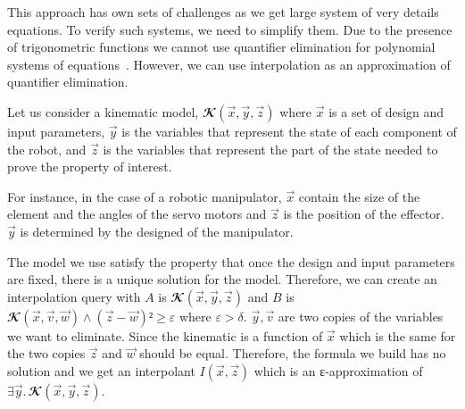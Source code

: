 This approach has own sets of challenges as we get large system of very details equations.
To verify such systems, we need to simplify them.
Due to the presence of trigonometric functions we cannot use quantifier elimination for polynomial systems of equations~\cite{qepcad}.
However, we can use interpolation as an approximation of quantifier elimination.

Let us consider a kinematic model, $𝓚(\vec x,\vec y,\vec z)$ where $\vec x$ is a set of design and input parameters, $\vec y$ is the variables that represent the state of each component of the robot, and $\vec z$ is the variables that represent the part of the state needed to prove the property of interest.

For instance, in the case of a robotic manipulator, $\vec x$ contain the size of the element and the angles of the servo motors and $\vec z$ is the position of the effector.
$\vec y$ is determined by the designed of the manipulator.

The model we use satisfy the property that once the design and input parameters are fixed, there is a unique solution for the model.
Therefore, we can create an interpolation query with $A$ is $𝓚(\vec x,\vec y,\vec z)$ and $B$ is $𝓚(\vec x,\vec v,\vec w) ∧ (\vec z-\vec w)² ≥ ε$ where $ε > δ$.
$\vec y, \vec v$ are two copies of the variables we want to eliminate.
Since the kinematic is a function of $\vec x$ which is the same for the two copies $\vec z$ and $\vec w$ should be equal.
Therefore, the formula we build has no solution and we get an interpolant $I(\vec x,\vec z)$ which is an ε-approximation of $∃ \vec y.\,𝓚(\vec x,\vec y,\vec z)$.

